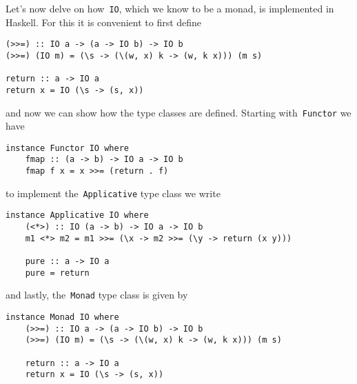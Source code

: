 \documentclass[../TFG.tex]{subfiles}
\begin{document}
Let's now delve on how~\texttt{IO}, which we know to be a monad, is
implemented in Haskell. For this it is convenient to first define
\begin{verbatim}
(>>=) :: IO a -> (a -> IO b) -> IO b
(>>=) (IO m) = (\s -> (\(w, x) k -> (w, k x))) (m s)

return :: a -> IO a
return x = IO (\s -> (s, x))
\end{verbatim}
and now we can show how the type classes are defined. Starting
with~\texttt{Functor} we have
\begin{verbatim}
instance Functor IO where
    fmap :: (a -> b) -> IO a -> IO b
    fmap f x = x >>= (return . f)
\end{verbatim}
to implement the~\texttt{Applicative} type class we write
\begin{verbatim}
instance Applicative IO where
    (<*>) :: IO (a -> b) -> IO a -> IO b
    m1 <*> m2 = m1 >>= (\x -> m2 >>= (\y -> return (x y)))

    pure :: a -> IO a
    pure = return
\end{verbatim}
and lastly, the~\texttt{Monad} type class is given by
\begin{verbatim}
instance Monad IO where
    (>>=) :: IO a -> (a -> IO b) -> IO b
    (>>=) (IO m) = (\s -> (\(w, x) k -> (w, k x))) (m s)

    return :: a -> IO a
    return x = IO (\s -> (s, x))
\end{verbatim}
\end{document}
